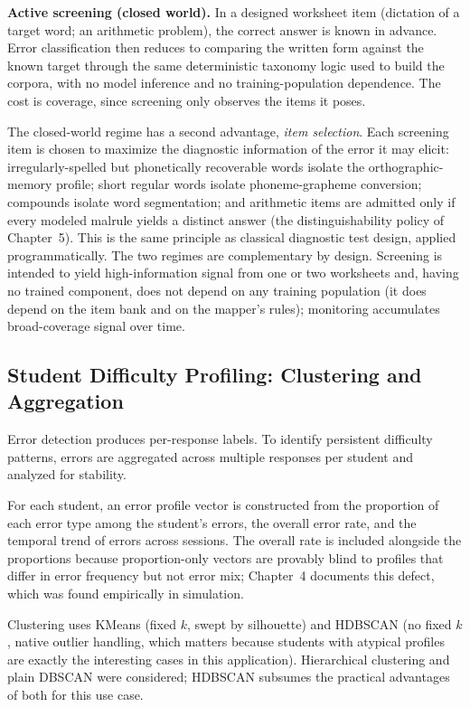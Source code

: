 \textbf{Active screening (closed world).} In a designed worksheet item (dictation of a target word; an arithmetic problem), the correct answer is known in advance. Error classification then reduces to comparing the written form against the known target through the same deterministic taxonomy logic used to build the corpora, with no model inference and no training-population dependence. The cost is coverage, since screening only observes the items it poses.

The closed-world regime has a second advantage, \emph{item selection}. Each screening item is chosen to maximize the diagnostic information of the error it may elicit: irregularly-spelled but phonetically recoverable words isolate the orthographic-memory profile; short regular words isolate phoneme-grapheme conversion; compounds isolate word segmentation; and arithmetic items are admitted only if every modeled malrule yields a distinct answer (the distinguishability policy of Chapter~5). This is the same principle as classical diagnostic test design, applied programmatically. The two regimes are complementary by design. Screening is intended to yield high-information signal from one or two worksheets and, having no trained component, does not depend on any training population (it does depend on the item bank and on the mapper's rules); monitoring accumulates broad-coverage signal over time.

\subsection{Student Difficulty Profiling: Clustering and Aggregation}
\label{sec:method_models_profile}

Error detection produces per-response labels. To identify persistent difficulty patterns, errors are aggregated across multiple responses per student and analyzed for stability.

For each student, an error profile vector is constructed from the proportion of each error type among the student's errors, the overall error rate, and the temporal trend of errors across sessions. The overall rate is included alongside the proportions because proportion-only vectors are provably blind to profiles that differ in error frequency but not error mix; Chapter~4 documents this defect, which was found empirically in simulation.

Clustering uses KMeans (fixed $k$, swept by silhouette) and HDBSCAN \parencite{Campello2013HDBSCAN} (no fixed $k$, native outlier handling, which matters because students with atypical profiles are exactly the interesting cases in this application). Hierarchical clustering and plain DBSCAN were considered; HDBSCAN subsumes the practical advantages of both for this use case.

